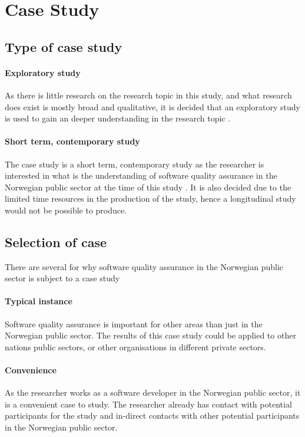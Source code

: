 \section{Case Study}

\subsection{Type of case study}
\paragraph{Exploratory study}
As there is little research on the research topic in this study, and what research does exist is mostly broad and qualitative, it is decided that an exploratory study is used to gain an deeper understanding in the research topic \cite{bjo_2022}.

\paragraph{Short term, contemporary study} 
The case study is a short term, contemporary study as the researcher is interested in what is the understanding of software quality assurance in the Norwegian public sector at the time of this study \cite{bjo_2022}. It is also decided due to the limited time resources in the production of the study, hence a longitudinal study would not be possible to produce.

\subsection{Selection of case}
There are several for why software quality assurance in the Norwegian public sector is subject to a case study

\paragraph{Typical instance}
Software quality assurance is important for other areas than just in the Norwegian public sector. The results of this case study could be applied to other nations public sectors, or other organisations in different private sectors.

\paragraph{Convenience}
As the researcher works as a software developer in the Norwegian public sector, it is a convenient case to study. The researcher already has contact with potential participants for the study and in-direct contacts with other potential participants in the Norwegian public sector.

